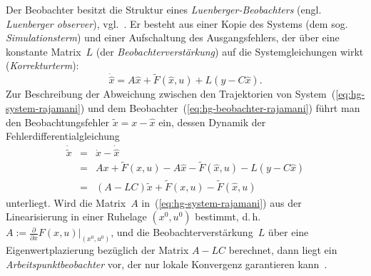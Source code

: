 Der Beobachter besitzt die Struktur eines \emph{Luenberger-Beobachters}
(engl. \emph{Luenberger observer}), vgl.~\cite{luenberger64,luenberger66}.
Er besteht aus einer Kopie des Systems (dem sog. \textit{Simulationsterm})
und einer Aufschaltung des Ausgangsfehlers, der über eine konstante
Matrix~$L$ (der \textit{Beobachterverstärkung}) auf die Systemgleichungen
wirkt (\textit{Korrekturterm}): 
\begin{equation}
\dot{\hat{x}}=A\hat{x}+\widetilde{F}(\hat{x},u)+L(y-C\hat{x}).\label{eq:hg-beobachter-rajamani}
\end{equation}
Zur Beschreibung der Abweichung zwischen den Trajektorien von System~(\ref{eq:hg-system-rajamani})
und dem Beobachter~(\ref{eq:hg-beobachter-rajamani}) führt man den
Beobachtungsfehler $\tilde{x}=x-\hat{x}$ ein, dessen Dynamik der
Fehlerdifferentialgleichung
\begin{equation}
\begin{array}{lcl}
\dot{\tilde{x}} & = & \dot{x}-\dot{\hat{x}}\\
 & = & Ax+\widetilde{F}(x,u)-A\hat{x}-\widetilde{F}(\hat{x},u)-L(y-C\hat{x})\\
 & = & \left(A-LC\right)\tilde{x}+\widetilde{F}(x,u)-\widetilde{F}(\hat{x},u)
\end{array}\label{eq:hg-fehler-dgl-rajamani}
\end{equation}
unterliegt. Wird die Matrix~$A$ in~(\ref{eq:hg-system-rajamani})
aus der Linearisierung in einer Ruhelage $(x^{0},u^{0})$ bestimmt,
d.\,h. $A:=\tfrac{\partial}{\partial x}F(x,u)|_{(x^{0},u^{0})}$,
und die Beobachterverstärkung~$L$ über eine Eigenwertplazierung
bezüglich der Matrix $A-LC$ berechnet, dann liegt ein \emph{Arbeitspunktbeobachter}
vor, der nur lokale Konvergenz garantieren kann~\cite{rothfuss93,birk90,adamy2014}.

